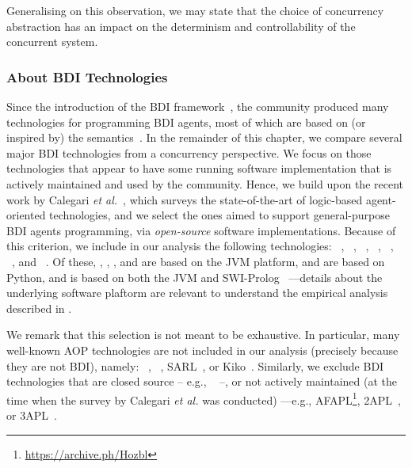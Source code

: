 Generalising on this observation, 
we may state that the choice of concurrency abstraction has an impact on the determinism and controllability of the concurrent system.

\subsubsection{About \ac{BDI} Technologies}

Since the introduction of the \acl{BDI} framework~\cite{bratman1988bdi},
the community produced many technologies for programming \ac{BDI} agents,
most of which are based on (or inspired by) the \agentspeak{} semantics~\cite{rao1996maamaw}.
%
In the remainder of this chapter,
we compare several major \ac{BDI} technologies from a concurrency perspective.
%
We focus on those technologies that appear to have some running software implementation
that is actively maintained and used by the community.
%
Hence,
we build upon the recent work by Calegari \textit{et al.}~\cite{lptech4mas-jaamas35},
which surveys the state-of-the-art of logic-based agent-oriented technologies,
and we select the ones aimed to support general-purpose \ac{BDI} agents programming,
via \emph{open-source} software implementations.
%
Because of this criterion,
we include in our analysis the following technologies:
\astra~\cite{CollierRL15},
\goal{}~\cite{Hindriks2009},
\jadex~\cite{PokahrBL2005},
\jakta~\cite{BaiardiBCP23},
\jason~\cite{BordiniHW2007},
\phidias~\cite{DUrsoLS19},
and
\spadebdi~\cite{PalancaRCJT22}.
%
Of these,
\astra, \jadex, \jakta, and \jason{} are based on the \ac{JVM} platform,
\phidias{} and \spadebdi{} are based on Python,
and \goal{} is based on both the \ac{JVM} and SWI-Prolog~\cite{WielemakerHM08}%
---details about the underlying software plaftorm are relevant 
to understand the empirical analysis described in .

We remark that this selection is not meant to be exhaustive.
%
In particular, 
many well-known \ac{AOP} technologies are not included in our analysis
(precisely because they are not \ac{BDI}),
namely: \jade{}~\cite{BellifemineCG07}, \spade{}~\cite{PalancaRCJT22}, SARL~\cite{iat2014}, or Kiko~\cite{ChristieSC2023}.
%
Similarly,
we exclude \ac{BDI} technologies that are closed source
-- e.g., \jack~\cite{Winikoff2005} --,
or not actively maintained 
(at the time when the survey by Calegari \textit{et al.} \cite{lptech4mas-jaamas35} was conducted)%
---e.g., AFAPL\footnote{\url{https://archive.ph/Hozbl}}, 
2APL~\cite{Dastani08},
or 3APL~\cite{HindriksBHM99}.

